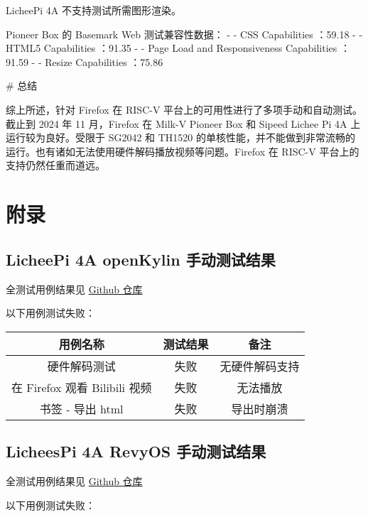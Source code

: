 \documentclass{article}
\begin{document}
\begin{markdown}
LicheePi 4A 不支持测试所需图形渲染。

Pioneer Box 的 Basemark Web 测试兼容性数据：
- - CSS Capabilities ：59.18%
- - HTML5 Capabilities ：91.35%
- - Page Load and Responsiveness Capabilities ：91.59%
- - Resize Capabilities ：75.86%

# 总结

综上所述，针对 Firefox 在 RISC-V 平台上的可用性进行了多项手动和自动测试。截止到 2024 年 11 月，Firefox 在 Milk-V Pioneer Box 和 Sipeed Lichee Pi 4A 上运行较为良好。受限于 SG2042 和 TH1520 的单核性能，并不能做到非常流畅的运行。也有诸如无法使用硬件解码播放视频等问题。Firefox 在 RISC-V 平台上的支持仍然任重而道远。


\end{markdown}

\newpage
\section*{附录}

\appendix

\subsection{LicheePi 4A openKylin 手动测试结果}

全测试用例结果见 \href{https://github.com/QA-Team-lo/firefox_test/tree/main/l_ok}{Github 仓库}

以下用例测试失败：
\begin{table}[H]
\centering
\begin{tabular}{|c|c|c|}
\hline
\textbf{用例名称} & \textbf{测试结果} & \textbf{备注} \\ \hline
硬件解码测试 & 失败 & 无硬件解码支持 \\ \hline
在 Firefox 观看 Bilibili 视频 & 失败 & 无法播放 \\ \hline
书签 - 导出 html & 失败 & 导出时崩溃 \\ \hline
\end{tabular}
\end{table}

\subsection{LicheesPi 4A RevyOS 手动测试结果}

全测试用例结果见 \href{https://github.com/QA-Team-lo/firefox_test/tree/main/l_re}{Github 仓库}

以下用例测试失败：
\end{document}
